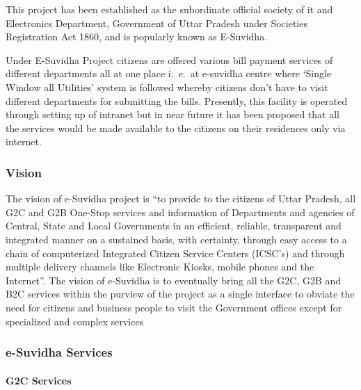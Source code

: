 This project has been established as the subordinate official society of \gls{it} and Electronics Department, Government of Uttar Pradesh under Societies Registration Act 1860, and is popularly known as E-Suvidha.

Under E-Suvidha Project citizens are offered various bill payment services of different departments all at one place i.\ e.\ at e-suvidha centre where ‘Single Window all Utilities’ system is followed whereby citizens don’t have to visit different departments for submitting the bills. Presently, this facility is operated through setting up of intranet but in near future it has been proposed that all the services would be made available to the citizens on their residences only via internet.


\subsubsection*{Vision}
The vision of e-Suvidha project is “to provide to the citizens of Uttar Pradesh, all G2C and G2B   One-Stop services and information of Departments and agencies of Central, State and Local Governments in an efficient, reliable, transparent and integrated manner on a sustained basis, with certainty, through easy access to a chain of computerized Integrated Citizen Service Centers (ICSC’s) and through multiple delivery channels like Electronic Kiosks, mobile phones and the Internet”.
The vision of e-Suvidha is to eventually bring all the G2C, G2B and B2C services within the purview of the project as a single interface to obviate the need for citizens and business people to visit the Government offices except for specialized and complex services



\subsubsection*{e-Suvidha Services}
\paragraph*{G2C Services}


